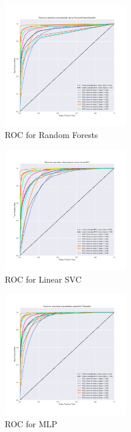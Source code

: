 \documentclass[a4paper,english,12pt, twocolumn]{article}
\begin{document}
\begin{figure}[H]
	\centering
	\includegraphics[width=0.48\textwidth,keepaspectratio]{ROC_OvR_RandomForestClassifier}
	\caption{ROC for Random Forests}
\end{figure}

\begin{figure}[H]
	\centering
	\includegraphics[width=0.48\textwidth,keepaspectratio]{ROC_OvR_LinearSVC}
	\caption{ROC for Linear SVC}
\end{figure}

\begin{figure}[H]
	\centering
	\includegraphics[width=0.48\textwidth,keepaspectratio]{ROC_OvR_MLPClassifier}
	\caption{ROC for MLP}
\end{figure}
\end{document}
